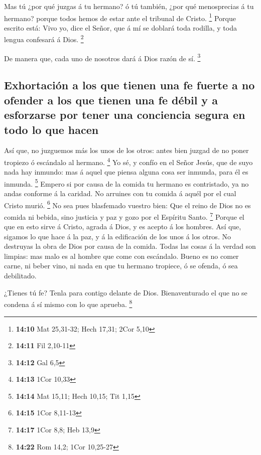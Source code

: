  Mas tú ¿por qué juzgas á tu hermano? ó tú también, ¿por
qué menosprecias á tu hermano? porque todos hemos de estar ante el
tribunal de Cristo. \footnote{\textbf{14:10} Mat 25,31-32; Hech 17,31;
  2Cor 5,10}  Porque escrito está: Vivo yo, dice el Señor,
que á mí se doblará toda rodilla, y toda lengua confesará á Dios.
\footnote{\textbf{14:11} Fil 2,10-11}

 De manera que, cada uno de nosotros dará á Dios razón de
sí. \footnote{\textbf{14:12} Gal 6,5}

\hypertarget{exhortaciuxf3n-a-los-que-tienen-una-fe-fuerte-a-no-ofender-a-los-que-tienen-una-fe-duxe9bil-y-a-esforzarse-por-tener-una-conciencia-segura-en-todo-lo-que-hacen}{%
\subsection{Exhortación a los que tienen una fe fuerte a no ofender a
los que tienen una fe débil y a esforzarse por tener una conciencia
segura en todo lo que
hacen}\label{exhortaciuxf3n-a-los-que-tienen-una-fe-fuerte-a-no-ofender-a-los-que-tienen-una-fe-duxe9bil-y-a-esforzarse-por-tener-una-conciencia-segura-en-todo-lo-que-hacen}}

 Así que, no juzguemos más los unos de los otros: antes
bien juzgad de no poner tropiezo ó escándalo al hermano. \footnote{\textbf{14:13}
  1Cor 10,33}  Yo sé, y confío en el Señor Jesús, que de
suyo nada hay inmundo: mas á aquel que piensa alguna cosa ser inmunda,
para él es inmunda. \footnote{\textbf{14:14} Mat 15,11; Hech 10,15; Tit
  1,15}  Empero si por causa de la comida tu hermano es
contristado, ya no andas conforme á la caridad. No arruines con tu
comida á aquél por el cual Cristo murió. \footnote{\textbf{14:15} 1Cor
  8,11-13}  No sea pues blasfemado vuestro bien:
 Que el reino de Dios no es comida ni bebida, sino justicia
y paz y gozo por el Espíritu Santo. \footnote{\textbf{14:17} 1Cor 8,8;
  Heb 13,9}  Porque el que en esto sirve á Cristo, agrada á
Dios, y es acepto á los hombres.  Así que, sigamos lo que
hace á la paz, y á la edificación de los unos á los otros. 
No destruyas la obra de Dios por causa de la comida. Todas las cosas á
la verdad son limpias: mas malo es al hombre que come con escándalo.
 Bueno es no comer carne, ni beber vino, ni nada en que tu
hermano tropiece, ó se ofenda, ó sea debilitado.

 ¿Tienes tú fe? Tenla para contigo delante de Dios.
Bienaventurado el que no se condena á sí mismo con lo que aprueba.
\footnote{\textbf{14:22} Rom 14,2; 1Cor 10,25-27}

